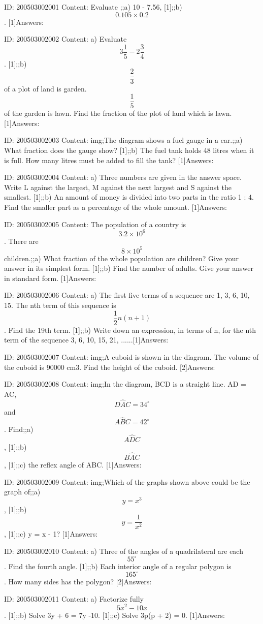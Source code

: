 \documentclass{article}
\begin{document}
ID: 200503002001
Content:
Evaluate ;;a) 10 - 7.56, [1];;b) $$0.105 \times 0.2$$. [1]Answers:

ID: 200503002002
Content:
a) Evaluate $$3\frac{1}{5}-2\frac{3}{4}$$. [1];;b) $$\frac{2}{3}$$of a plot of land is garden. $$\frac{1}{5}$$ of the garden is lawn. Find the fraction of the plot of land which is lawn. [1]Answers:

ID: 200503002003
Content:
img;The diagram shows a fuel gauge in a car.;;a) What fraction does the gauge show? [1];;b) The fuel tank holds 48 litres when it is full. How many litres must be added to fill the tank? [1]Answers:

ID: 200503002004
Content:
a) Three numbers are given in the answer space. Write L against the largest, M against the next largest and S against the smallest. [1];;b) An amount of money is divided into two parts in the ratio 1 : 4. Find the smaller part as a percentage of the whole amount. [1]Answers:

ID: 200503002005
Content:
The population of a country is $$3.2 \times 10^6$$. There are $$8 \times 10^5$$ children.;;a) What fraction of the whole population are children? Give your answer in its simplest form. [1];;b) Find the number of adults. Give your answer in standard form. [1]Answers:

ID: 200503002006
Content:
a) The first five terms of a sequence are 1, 3, 6, 10, 15. The nth term of this sequence is $$\frac{1}{2}n(n+1)$$. Find the 19th term. [1];;b) Write down an expression, in terms of n, for the nth term of the sequence 3, 6, 10, 15, 21, ......[1]Answers:

ID: 200503002007
Content:
img;A cuboid is shown in the diagram. The volume of the cuboid is 90000 cm3. Find the height of the cuboid. [2]Answers:

ID: 200503002008
Content:
img;In the diagram, BCD is a straight line. AD = AC, $$D \hat AC=34^{\circ}$$ and $$A \hat BC=42^{\circ}$$. Find;;a) $$A \hat DC$$, [1];;b) $$B \hat AC$$, [1];;c) the reflex angle of ABC. [1]Answers:

ID: 200503002009
Content:
img;Which of the graphs shown above could be the graph of;;a) $$y=x^{3} $$ ,  [1];;b) $$y=\frac{1}{x^{2}}$$, [1];;c) y = x - 1? [1]Answers:

ID: 200503002010
Content:
a) Three of the angles of a quadrilateral are each $$55^{\circ}$$. Find the fourth angle. [1];;b) Each interior angle of a regular polygon is $$165^{\circ}$$. How many sides has the polygon? [2]Answers:

ID: 200503002011
Content:
a) Factorize fully $$5x^{2} -10x$$. [1];;b) Solve 3y + 6 = 7y -10. [1];;c) Solve 3p(p + 2) = 0. [1]Answers:
\end{document}

